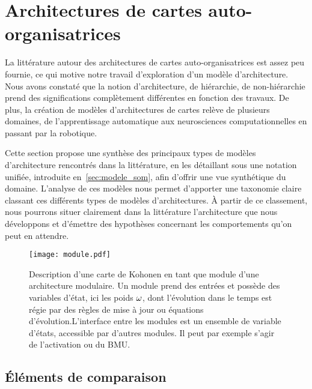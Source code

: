 \documentclass[../main]{subfiles}
\begin{document}
\section{Architectures de cartes auto-organisatrices}

La littérature autour des architectures de cartes auto-organisatrices est assez peu fournie, ce qui motive notre travail d'exploration d'un modèle d'architecture. 
Nous avons constaté que la notion d'architecture, de hiérarchie, de non-hiérarchie prend des significations complètement différentes en fonction des travaux. De plus, la création de modèles d'architectures de cartes relève de plusieurs domaines, de l'apprentissage automatique aux neurosciences computationnelles en passant par la robotique.

Cette section propose une synthèse des principaux types de modèles d'architecture rencontrés dans la littérature, en les détaillant sous une notation unifiée, introduite en~\ref{sec:modele_som}, afin d'offrir une vue synthétique du domaine. L'analyse de ces modèles nous permet d'apporter une taxonomie claire classant ces différents types de modèles d'architectures. \`A partir de ce classement, nous pourrons situer clairement dans la littérature l'architecture que nous développons et d'émettre des hypothèses concernant les comportements qu'on peut en attendre.

\begin{figure}
    \centering
    \texttt{[image: module.pdf]}
    \caption{Description d'une carte de Kohonen en tant que module d'une architecture modulaire. Un module prend des entrées et possède des variables d'état, ici les poids $\omega$, dont l'évolution dans le temps est régie par des règles de mise à jour ou équations d'évolution.L'interface entre les modules est un ensemble de variable d'états, accessible par d'autres modules. Il peut par exemple s'agir de l'activation ou du BMU. \label{fig:module}}
\end{figure}

\subsection{\'Eléments de comparaison}
\end{document}
